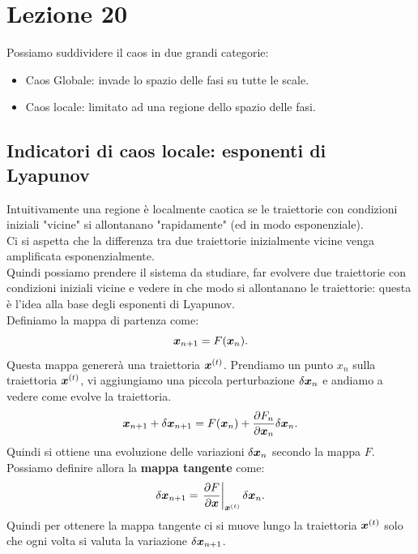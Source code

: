 \section{Lezione 20}%
\label{sub:Lezione 20}
Possiamo suddividere il caos in due grandi categorie:
\begin{itemize}
    \item Caos Globale: invade lo spazio delle fasi su tutte le scale.
    \item Caos locale: limitato ad una regione dello spazio delle fasi.
\end{itemize}
\subsection{Indicatori di caos locale: esponenti di Lyapunov}%
\label{sub:Indicatori di caos locale: esponenti di Lyapanov}
Intuitivamente una regione è localmente caotica se le traiettorie con condizioni iniziali "vicine" si allontanano "rapidamente" (ed in modo esponenziale).\\
Ci si aspetta che la differenza tra due traiettorie inizialmente vicine venga amplificata esponenzialmente.\\
Quindi possiamo prendere il sistema da studiare, far evolvere due traiettorie con condizioni iniziali vicine e vedere in che modo si allontanano le traiettorie: questa è l'idea alla base degli esponenti di Lyapunov.\\
Definiamo la mappa di partenza come:
\[
    \boldsymbol{x}_{n+1} = F(\boldsymbol{x}_n)
.\] 
Questa mappa genererà una traiettoria $\boldsymbol{x}^{(t)}$. Prendiamo un punto $x_n$ sulla traiettoria $\boldsymbol{x}^{(t)}$, vi aggiungiamo una piccola perturbazione $\delta\boldsymbol{x}_n$ e andiamo a vedere come evolve la traiettoria.
\[
    \boldsymbol{x}_{n+1} + \delta\boldsymbol{x}_{n+1} = F(\boldsymbol{x}_n) + \frac{\partial F_n}{\partial \boldsymbol{x}_n}  \delta\boldsymbol{x}_n
.\] 
Quindi si ottiene una evoluzione delle variazioni $\delta\boldsymbol{x}_n$ secondo la mappa $F$. Possiamo definire allora la \textbf{mappa tangente} come:
\[
    \delta\boldsymbol{x}_{n+1} = \left.\frac{\partial F}{\partial \boldsymbol{x}} \right|_{\boldsymbol{x}^{(t)}}\delta\boldsymbol{x}_n
.\] 
Quindi per ottenere la mappa tangente ci si muove lungo la traiettoria $\boldsymbol{x}^{(t)}$  solo che ogni volta si valuta la variazione $\delta\boldsymbol{x}_{n+1}$.
